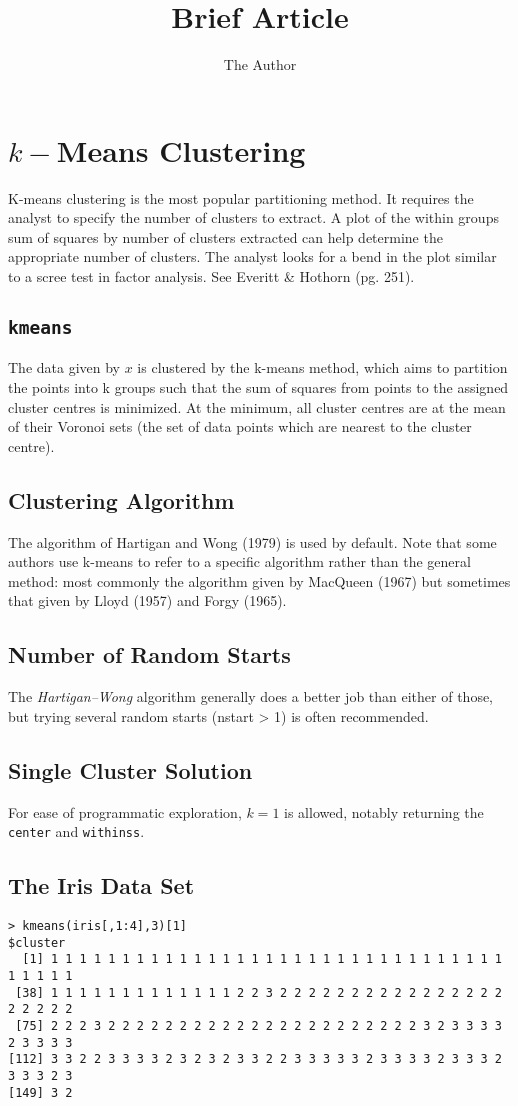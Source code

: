 \documentclass[11pt]{article} %
\title{Brief Article}
\author{The Author}
\begin{document}
\tableofcontents
\newpage
\section{$k-$Means Clustering}
K-means clustering is the most popular partitioning method. It requires the analyst to specify the number of clusters to extract. A plot of the within groups sum of squares by number of clusters extracted can help determine the appropriate number of clusters. The analyst looks for a bend in the plot similar to a scree test in factor analysis. See Everitt & Hothorn (pg. 251).
\subsection{\texttt{kmeans}}
The data given by $x$ is clustered by the k-means method, which aims to partition the points into k groups such that the sum of squares from points to the assigned cluster centres is minimized. At the minimum, all cluster centres are at the mean of their Voronoi sets (the set of data points which are nearest to the cluster centre).

\subsection{Clustering Algorithm}

The algorithm of Hartigan and Wong (1979) is used by default. Note that some authors use k-means to refer to a specific algorithm rather than the general method: most commonly the algorithm given by MacQueen (1967) but sometimes that given by Lloyd (1957) and Forgy (1965). 

\subsection{Number of Random Starts}
The \textit{Hartigan–Wong} algorithm generally does a better job than either of those, but trying several random starts (nstart  > 1) is often recommended.

\subsection{Single Cluster Solution}For ease of programmatic exploration, $k=1$ is allowed, notably returning the \texttt{center} and \texttt{withinss}.

\subsection{The Iris Data Set}
\begin{verbatim}
> kmeans(iris[,1:4],3)[1]
$cluster
  [1] 1 1 1 1 1 1 1 1 1 1 1 1 1 1 1 1 1 1 1 1 1 1 1 1 1 1 1 1 1 1 1 1 1 1 1 1 1
 [38] 1 1 1 1 1 1 1 1 1 1 1 1 1 2 2 3 2 2 2 2 2 2 2 2 2 2 2 2 2 2 2 2 2 2 2 2 2
 [75] 2 2 2 3 2 2 2 2 2 2 2 2 2 2 2 2 2 2 2 2 2 2 2 2 2 2 3 2 3 3 3 3 2 3 3 3 3
[112] 3 3 2 2 3 3 3 3 2 3 2 3 2 3 3 2 2 3 3 3 3 3 2 3 3 3 3 2 3 3 3 2 3 3 3 2 3
[149] 3 2
\end{verbatim}
\end{document}
